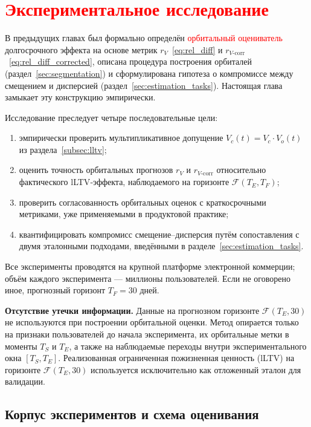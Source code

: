 \section{\textcolor{red}{Экспериментальное исследование}}
\label{sec:experiments}

В предыдущих главах был формально определён \textcolor{red}{орбитальный оцениватель}
долгосрочного эффекта на основе метрик $r_V$~\eqref{eq:rel_diff} и
$r_{V\text{-corr}}$~\eqref{eq:rel_diff_corrected}, описана процедура
построения орбиталей (раздел~\ref{sec:segmentation}) и сформулирована
гипотеза о компромиссе между смещением и дисперсией
(раздел~\ref{sec:estimation_tasks}). Настоящая глава замыкает эту
конструкцию эмпирически.

Исследование преследует четыре последовательные цели:
\begin{enumerate}
    \item эмпирически проверить мультипликативное допущение
          $V_c(t) = V_c \cdot V_o(t)$ из раздела~\ref{subsec:lltv};
    \item оценить точность орбитальных прогнозов $r_V$ и
          $r_{V\text{-corr}}$ относительно фактического lLTV‑эффекта,
          наблюдаемого на горизонте $\mathcal{F}(T_E, T_F)$;
    \item проверить согласованность орбитальных оценок с
          краткосрочными метриками, уже применяемыми в продуктовой
          практике;
    \item квантифицировать компромисс смещение–дисперсия путём
          сопоставления с двумя эталонными подходами, введёнными в
          разделе~\ref{sec:estimation_tasks}.
\end{enumerate}

Все эксперименты проводятся на крупной платформе электронной
коммерции; объём каждого эксперимента — миллионы пользователей. Если
не оговорено иное, прогнозный горизонт $T_F = 30$ дней.

\textbf{Отсутствие утечки информации.} Данные на прогнозном горизонте
$\mathcal{F}(T_E, 30)$ не используются при построении орбитальной
оценки. Метод опирается только на признаки пользователей до начала
эксперимента, их орбитальные метки в моменты $T_S$ и $T_E$, а также
на наблюдаемые переходы внутри экспериментального окна $[T_S,T_E]$.
Реализованная ограниченная пожизненная ценность (lLTV) на горизонте
$\mathcal{F}(T_E, 30)$ используется исключительно как отложенный
эталон для валидации.


\subsection{Корпус экспериментов и схема оценивания}
\label{subsec:corpus_n_setup}


